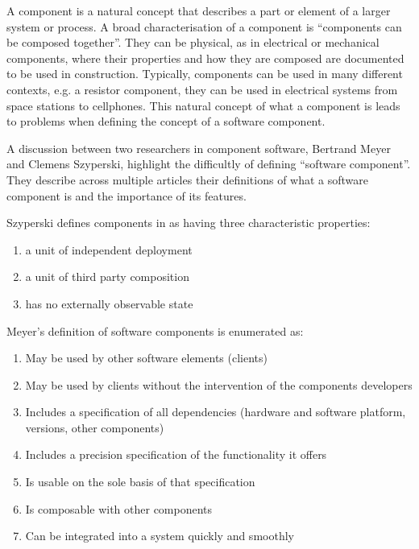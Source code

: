A component is a natural concept that describes a part or element of a larger system or process.
A broad characterisation of a component is ``components can be composed together''.
They can be physical, as in electrical or mechanical components, where their properties and how they are composed are documented to be used in construction.
Typically, components can be used in many different contexts, e.g. a resistor component, they can be used in electrical systems from space stations to cellphones.   
This natural concept of what a component is leads to problems when defining the concept of a software component.

A discussion between two researchers in component software, Bertrand Meyer and Clemens Szyperski, highlight the difficultly of defining ``software component''. 
They describe across multiple articles \citep{Meyer1999,Szyperski2000a, Szyperski2000, Meyer2000} their definitions of what a software component is and the importance of its features.

Szyperski defines components in \citep{Szyperski2002} as having three characteristic properties:
\begin{enumerate}
  \item a unit of independent deployment
  \item a unit of third party composition
  \item has no externally observable state
\end{enumerate}

Meyer's definition of software components is enumerated as:
\begin{enumerate}
  \item May be used by other software elements (clients)
  \item May be used by clients without the intervention of the components developers
  \item Includes a specification of all dependencies (hardware and software platform, versions, other components)
  \item Includes a precision specification of the functionality it offers
  \item Is usable on the sole basis of that specification
  \item Is composable with other components
  \item Can be integrated into a system quickly and smoothly
\end{enumerate}

